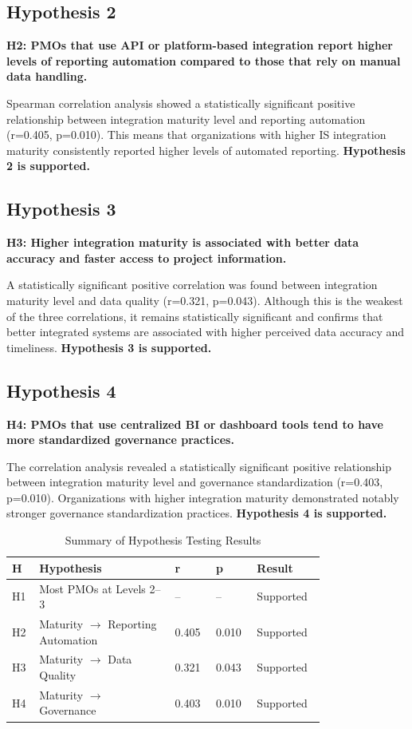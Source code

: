 \subsection{Hypothesis 2}
\textbf{H2: PMOs that use API or platform-based integration report
higher levels of reporting automation compared to those that rely
on manual data handling.}

Spearman correlation analysis showed a statistically significant
positive relationship between integration maturity level and
reporting automation (r=0.405, p=0.010). This means that
organizations with higher IS integration maturity consistently
reported higher levels of automated reporting.
\textbf{Hypothesis 2 is supported.}

\subsection{Hypothesis 3}
\textbf{H3: Higher integration maturity is associated with better
data accuracy and faster access to project information.}

A statistically significant positive correlation was found between
integration maturity level and data quality (r=0.321, p=0.043).
Although this is the weakest of the three correlations, it remains
statistically significant and confirms that better integrated systems
are associated with higher perceived data accuracy and timeliness.
\textbf{Hypothesis 3 is supported.}

\subsection{Hypothesis 4}
\textbf{H4: PMOs that use centralized BI or dashboard tools tend
to have more standardized governance practices.}

The correlation analysis revealed a statistically significant
positive relationship between integration maturity level and
governance standardization (r=0.403, p=0.010). Organizations
with higher integration maturity demonstrated notably stronger
governance standardization practices.
\textbf{Hypothesis 4 is supported.}

{\singlespacing
\begin{table}[h]
  \caption{Summary of Hypothesis Testing Results}
  \label{tab:hypothesis-results}
  \centering
  \begin{tabular}{p{0.05\linewidth}p{0.38\linewidth}p{0.10\linewidth}
  p{0.10\linewidth}p{0.15\linewidth}}
    \toprule
    \textbf{H} & \textbf{Hypothesis} & \textbf{r} & \textbf{p}
    & \textbf{Result}\\
    \midrule
    H1 & Most PMOs at Levels 2--3 & -- & -- & Supported\\
    H2 & Maturity $\to$ Reporting Automation & 0.405 & 0.010 & Supported\\
    H3 & Maturity $\to$ Data Quality & 0.321 & 0.043 & Supported\\
    H4 & Maturity $\to$ Governance & 0.403 & 0.010 & Supported\\
    \bottomrule
  \end{tabular}
\end{table}
}

